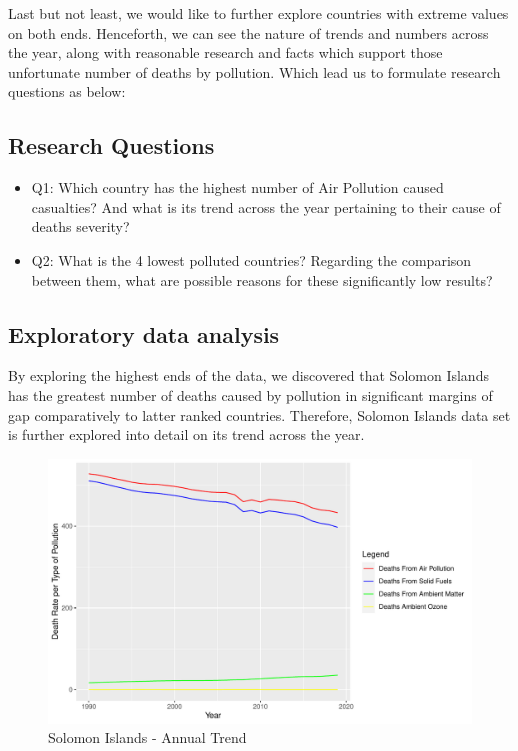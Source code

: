 \documentclass[11pt,a4paper,]{article}
\providecommand{\tightlist}{%
  \setlength{\itemsep}{0pt}\setlength{\parskip}{0pt}}
\begin{document}
Last but not least, we would like to further explore countries with extreme values on both ends. Henceforth, we can see the nature of trends and numbers across the year, along with reasonable research and facts which support those unfortunate number of deaths by pollution. Which lead us to formulate research questions as below:

\hypertarget{research-questions}{%
\subsection{Research Questions}\label{research-questions}}

\begin{itemize}
\tightlist
\item
  Q1: Which country has the highest number of Air Pollution caused casualties? And what is its trend across the year pertaining to their cause of deaths severity?
\item
  Q2: What is the 4 lowest polluted countries? Regarding the comparison between them, what are possible reasons for these significantly low results?
\end{itemize}

\hypertarget{exploratory-data-analysis-2}{%
\subsection{Exploratory data analysis}\label{exploratory-data-analysis-2}}

By exploring the highest ends of the data, we discovered that Solomon Islands has the greatest number of deaths caused by pollution in significant margins of gap comparatively to latter ranked countries. Therefore, Solomon Islands data set is further explored into detail on its trend across the year.

\begin{figure}[H]

{\centering \includegraphics[width=0.8\linewidth]{Assignment4_files/figure-latex/figure1-1} 

}

\caption{Solomon Islands - Annual Trend}\label{fig:figure1}
\end{figure}
\end{document}
